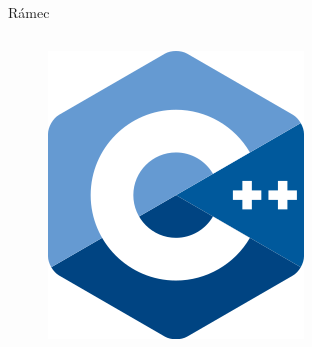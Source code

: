 \documentclass[aspectratio=169,xcolor=dvipsnames]{beamer}
\begin{document}
\begin{frame}{Rámec}
\begin{columns}[T]
\begin{column}{.31\textwidth}
			\begin{figure}
				\includegraphics[width=0.35\linewidth, trim={0 0 0 0cm}, clip]{Images/cpp.png}
			\end{figure}
		\end{column}%
	\end{columns}
\end{frame}
\end{document}
